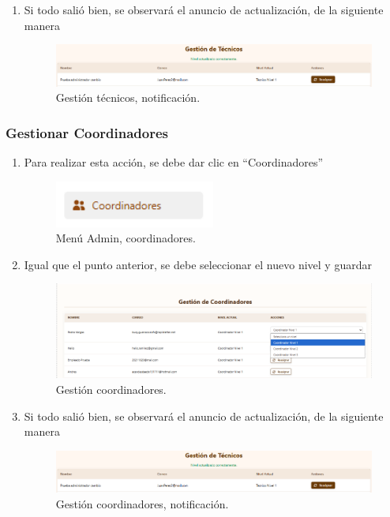 \begin{enumerate}
\item Si todo salió bien, se observará el anuncio de actualización, de la siguiente manera

\begin{figure}[H]
    \centering
    \includegraphics[width=0.7\linewidth]{guiamodulo/gestion-tecnicos-aviso.png}
    \caption{Gestión técnicos, notificación.}
    \label{fig:gestion-tecnicos-aviso.png}
\end{figure}

\end{enumerate}

\subsubsection{Gestionar Coordinadores}

\begin{enumerate}
\item Para realizar esta acción, se debe dar clic en “Coordinadores”

\begin{figure}[H]
    \centering
    \includegraphics[width=0.3\linewidth]{guiamodulo/menu-admin-coordinadores.png}
    \caption{Menú Admin, coordinadores.}
    \label{fig:menu-admin-coordinadores}
\end{figure}

\item Igual que el punto anterior, se debe seleccionar el nuevo nivel y guardar

\begin{figure}[H]
    \centering
    \includegraphics[width=0.7\linewidth]{guiamodulo/gestion-coordinadores.png}
    \caption{Gestión coordinadores.}
    \label{fig:gestion-coordinadores.png}
\end{figure}

\item Si todo salió bien, se observará el anuncio de actualización, de la siguiente manera

\begin{figure}[H]
    \centering
    \includegraphics[width=0.7\linewidth]{guiamodulo/gestion-tecnicos-aviso.png}
    \caption{Gestión coordinadores, notificación.}
    \label{fig:gestion-coordinadores-aviso.png}
\end{figure}

\end{enumerate}


